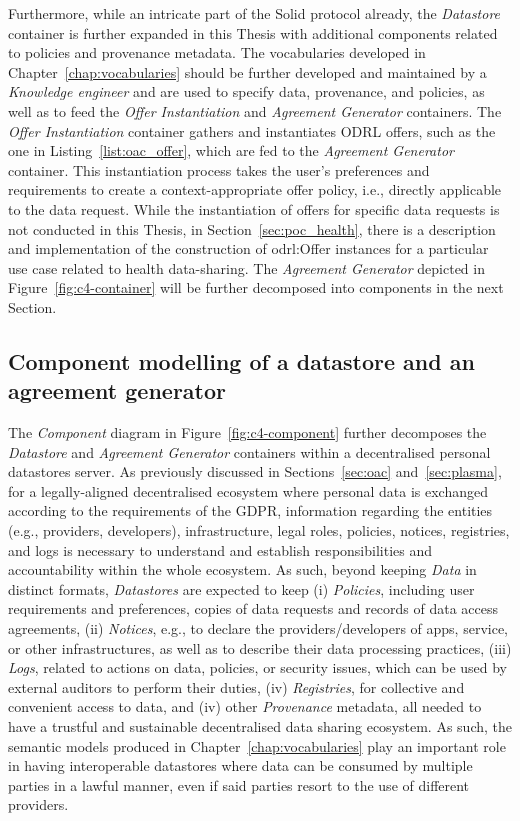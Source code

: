 Furthermore, while an intricate part of the Solid protocol already, the \textit{Datastore} container is further expanded in this Thesis with additional components related to policies and provenance metadata.
The vocabularies developed in Chapter~\ref{chap:vocabularies} should be further developed and maintained by a \textit{Knowledge engineer} and are used to specify data, provenance, and policies, as well as to feed the \textit{Offer Instantiation} and \textit{Agreement Generator} containers.
The \textit{Offer Instantiation} container gathers and instantiates ODRL offers, such as the one in Listing~\ref{list:oac_offer}, which are fed to the \textit{Agreement Generator} container.
This instantiation process takes the user's preferences and requirements to create a context-appropriate offer policy, i.e., directly applicable to the data request.
While the instantiation of offers for specific data requests is not conducted in this Thesis, in Section~\ref{sec:poc_health}, there is a description and implementation of the construction of odrl:Offer instances for a particular use case related to health data-sharing.
The \textit{Agreement Generator} depicted in Figure~\ref{fig:c4-container} will be further decomposed into components in the next Section.

\subsection{Component modelling of a datastore and an agreement generator}
\label{sec:c4_component}

The \textit{Component} diagram in Figure~\ref{fig:c4-component} further decomposes the \textit{Datastore} and \textit{Agreement Generator} containers within a decentralised personal datastores server.
As previously discussed in Sections~\ref{sec:oac} and~\ref{sec:plasma}, for a legally-aligned decentralised ecosystem where personal data is exchanged according to the requirements of the GDPR, information regarding the entities (e.g., providers, developers), infrastructure, legal roles, policies, notices, registries, and logs is necessary to understand and establish responsibilities and accountability within the whole ecosystem.
As such, beyond keeping \textit{Data} in distinct formats, \textit{Datastores} are expected to keep (i) \textit{Policies}, including user requirements and preferences, copies of data requests and records of data access agreements, (ii) \textit{Notices}, e.g., to declare the providers/developers of apps, service, or other infrastructures, as well as to describe their data processing practices, (iii) \textit{Logs}, related to actions on data, policies, or security issues, which can be used by external auditors to perform their duties, (iv) \textit{Registries}, for collective and convenient access to data, and (iv) other \textit{Provenance} metadata, all needed to have a trustful and sustainable decentralised data sharing ecosystem.
As such, the semantic models produced in Chapter~\ref{chap:vocabularies} play an important role in having interoperable datastores where data can be consumed by multiple parties in a lawful manner, even if said parties resort to the use of different providers.


